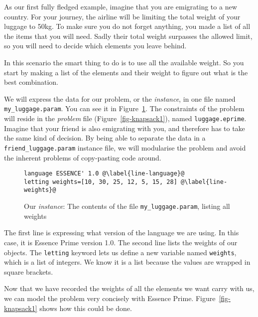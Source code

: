 As our first fully fledged example, imagine that you are emigrating to a new country. For
your journey, the airline will be limiting the total weight of your luggage to
50kg.  To make sure you do not forget anything, you made a list of all the
items that you will need. Sadly their total weight surpasses the allowed limit,
so you will need to decide which elements you leave behind.

In this scenario the smart thing to do is to use all the available weight. So
you start by making a list of the elements and their weight to figure out what
is the best combination. 

We will express the data for our problem, or the \emph{instance},  in one file
named \texttt{my\_luggage.param}.  You can see it in
Figure~\ref{fig-knapsack1param}.  The constraints of the problem will reside in
the \emph{problem} file (Figure~\ref{fig-knapsack1}), named
\texttt{luggage.eprime}. 
%
Imagine that your friend is also emigrating with you, and therefore has to
take the same kind of decision. By being able to separate the data in a
\texttt{friend\_luggage.param} instance file, we will modularise the problem
and avoid the inherent problems of copy-pasting code around.

\begin{figure}
\begin{lstlisting}
language ESSENCE' 1.0 @\label{line-language}@
letting weights=[10, 30, 25, 12, 5, 15, 28] @\label{line-weights}@
\end{lstlisting}
    \caption{Our \emph{instance}: The contents of the file
    \texttt{my\_luggage.param}, listing all weights}
\label{fig-knapsack1param}
\end{figure}

The first line is expressing what version of the language we are using.  In
this case, it is Essence Prime version 1.0.  The second line lists the
weights of our objects. The \texttt{letting} keyword lets us define a new
variable named \texttt{weights}, which is a list of integers.  We know it
is a list because the values are wrapped in square brackets.

Now that we have recorded the weights of all the elements we want carry with us,
we can model the problem very concisely with Essence Prime. Figure~\ref{fig-knapsack1}
shows how this could be done.


